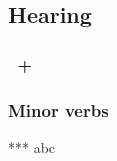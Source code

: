 \subsection{Hearing}

\subsubsection{}

\subsubsection{}

\subsubsection{~+ }

\subsubsection{Minor verbs}


\begin{frame}{***}
	abc
\end{frame}
 
